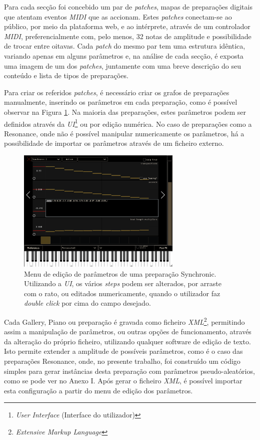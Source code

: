 \documentclass[../main.tex]{subfiles}
\begin{document}
Para cada secção foi concebido um par de \textsl{patches}, mapas de preparações digitais que atentam eventos \textsl{MIDI} que as accionam. Estes \textsl{patches} conectam-se ao público, por meio da plataforma web, e ao intérprete, através de um controlador \textsl{MIDI}, preferencialmente com, pelo menos, 32 notas de amplitude e possibilidade de trocar entre oitavas. Cada \textsl{patch} do mesmo par tem uma estrutura idêntica, variando apenas em alguns parâmetros e, na análise de cada secção, é exposta uma imagem de um dos \textsl{patches}, juntamente com uma breve descrição do seu conteúdo e lista de tipos de preparações.

Para criar os referidos \textsl{patches}, é necessário criar os grafos de preparações manualmente, inserindo os parâmetros em cada preparação, como é possível observar na Figura \ref{fig:bitsync}. Na maioria das preparações, estes parâmetros podem ser definidos através da \textsl{UI}\footnote{\textsl{User Interface} (Interface do utilizador)} ou por edição numérica. No caso de preparações como a Resonance, onde não é possível manipular numericamente os parâmetros, há a possibilidade de importar os parâmetros através de um ficheiro externo.

\begin{figure}[h]
    \centering
    \captionsetup{width=0.8\textwidth}
    \includegraphics[width=0.7\textwidth]{images/bitsync.png}
    \caption{Menu de edição de parâmetros de uma preparação Synchronic. Utilizando a \textsl{UI}, os vários \textsl{steps} podem ser alterados, por arraste com o rato, ou editados numericamente, quando o utilizador faz \textsl{double click} por cima do campo desejado.}
    \label{fig:bitsync}
\end{figure}

Cada Gallery, Piano ou preparação é gravada como ficheiro \textsl{XML}\footnote{\textsl{Extensive Markup Language}}, permitindo assim a manipulação de parâmetros, ou outras opções de funcionamento, através da alteração do próprio ficheiro, utilizando qualquer software de edição de texto. Isto permite extender a amplitude de possíveis parâmetros, como é o caso das preparações Resonance, onde, no presente trabalho, foi construído um código simples para gerar instâncias desta preparação com parâmetros pseudo-aleatórios, como se pode ver no Anexo I. Após gerar o ficheiro \textsl{XML}, é possível importar esta configuração a partir do menu de edição dos parâmetros.
\end{document}
